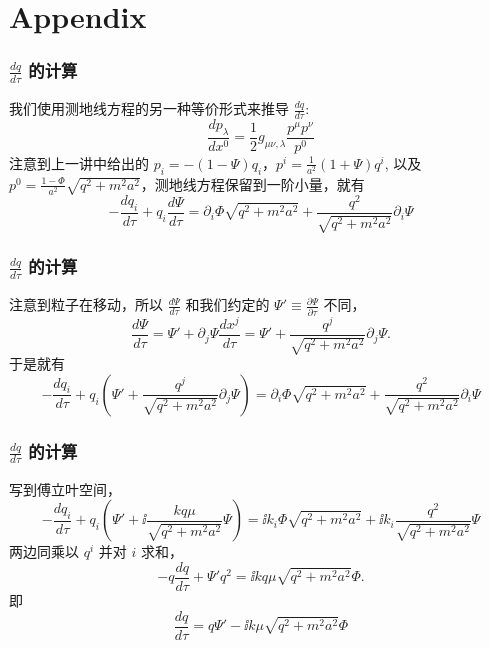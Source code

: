 \documentclass[CJK,13pt]{beamer}
\begin{document}
  \section{Appendix}

  \begin{frame}
    \frametitle{ $\frac{dq}{d\tau}$ 的计算}
    我们使用测地线方程的另一种等价形式来推导 $\frac{dq}{d\tau}$:
    {\blue    $$ \frac{d p_\lambda}{d x^0} = \frac{1}{2}g_{\mu\nu,\lambda}\frac{p^\mu p^\nu}{p^0}$$}
    注意到上一讲中给出的 $p_i = -(1-\Psi)q_i$，$p^i = \frac{1}{a^2}(1+\Psi)q^i$, 以及 $p^0 = \frac{1-\Phi}{a^2}\sqrt{q^2+m^2a^2}$，测地线方程保留到一阶小量，就有
    $$-\frac{dq_i}{d\tau} + q_i\frac{d\Psi}{d\tau}  = \partial_i\Phi \sqrt{q^2+m^2a^2} +  \frac{q^2}{\sqrt{q^2+m^2a^2}} \partial_i\Psi$$
  \end{frame}

  \begin{frame}
    \frametitle{ $\frac{dq}{d\tau}$ 的计算}    
    注意到粒子在移动，所以 $\frac{d\Psi}{d\tau}$ 和我们约定的 $\Psi' \equiv \frac{\partial\Psi}{\partial\tau}$ 不同，
    $$\frac{d\Psi}{d\tau} = \Psi' + \partial_j\Psi \frac{dx^j}{d\tau} = \Psi' +  \frac{q^j}{\sqrt{q^2+m^2a^2}}\partial_j\Psi.$$
    于是就有
   {\small $$-\frac{dq_i}{d\tau} + q_i\left(\Psi' +  \frac{q^j}{\sqrt{q^2+m^2a^2}} \partial_j\Psi \right) = \partial_i\Phi \sqrt{q^2+m^2a^2} +  \frac{q^2}{\sqrt{q^2+m^2a^2}}\partial_i\Psi $$}
  \end{frame}


  \begin{frame}
    \frametitle{ $\frac{dq}{d\tau}$ 的计算}
    写到傅立叶空间，
   {\small $$-\frac{dq_i}{d\tau} + q_i\left(\Psi' + \ii   \frac{kq\mu}{\sqrt{q^2+m^2a^2}} \Psi \right)= \ii k_i \Phi \sqrt{q^2+m^2a^2} + \ii k_i\frac{q^2}{\sqrt{q^2+m^2a^2}}\Psi  $$}
    两边同乘以 $q^i$ 并对 $i$ 求和，
    $$-q\frac{dq}{d\tau} + \Psi' q^2  = \ii kq \mu\sqrt{q^2+m^2a^2}\Phi.$$
    即
    $$\frac{dq}{d\tau} = q\Psi' - \ii k\mu\sqrt{q^2+m^2a^2} \Phi$$
    
  \end{frame}
  
  \ech
\end{document}
